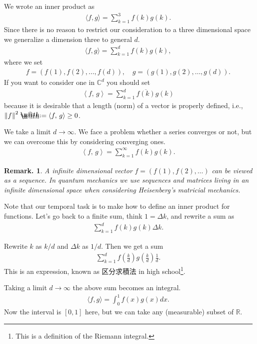 \documentclass[openany, a4paper, oneside]{jsbook}
\makeatletter
\newcommand*{\defeq}{\mathrel{\rlap{%
\raisebox{0.3ex}{$\m@th\cdot$}}%
\raisebox{-0.3ex}{$\m@th\cdot$}}%
=}
\theoremstyle{break}
\theoremstyle{breakdefn}
\newtheorem{rem}[thm]{Remark.}
\newcommand{\norm}[1]{\left\Vert#1\right\Vert}
\newcommand{\rbk}[1]{\left (#1\right)}
\newcommand{\bkt}[2]{\left\langle#1,\,#2\right\rangle}
\newcommand{\bbC}{\mathbb{C}}
\newcommand{\bbR}{\mathbb{R}}
\makeatother
\begin{document}
We wrote an inner product as
\begin{align}
 \langle f , g \rangle
 =
 \sum_{k=1}^3 f(k)g(k).
\end{align}
Since there is no reason to restrict our consideration to a three dimensional space
we generalize a dimension three to general $d$.
\begin{align}
 \langle f , g \rangle
 =
 \sum_{k=1}^d f(k)g(k),
\end{align}
where we set
\begin{align}
 f = \rbk{f(1), f(2), \dots, f(d)}, \quad
 g = \rbk{g(1), g(2), \dots, g(d)}.
\end{align}
If you want to consider one in $\bbC^d$ you should set
\begin{align}
 \bkt{f}{g}
 =
 \sum_{k=1}^d \overline{f(k)} g(k)
\end{align}
because it is desirable that a length (norm) of a vector is
properly defined, i.e., $\norm{f}^2 \defeq \bkt{f}{g} \geq 0$.

We take a limit $d \to \infty$.
We face a problem whether a series converges or not,
but we can overcome this by considering converging ones.
\begin{align}
 \bkt{f}{g}
 =
 \sum_{k=1}^{\infty} f(k)g(k).
\end{align}

\begin{rem}
 A infinite dimensional vector $f = (f(1), f(2), \dots)$
 can be viewed as a sequence.
 In quantum mechanics we use sequences and matrices living in an infinite dimensional space
 when considering Heisenberg's matricial mechanics.
\end{rem}

Note that our temporal task is to make how to define an inner product for functions.
Let's go back to a finite sum, think $1 = \Delta k$, and rewrite a sum as
\begin{align}
 \sum_{k=1}^{d} f(k)g(k) \Delta k.
\end{align}

Rewrite $k$ as $k/d$ and $\Delta k$ as $1/d$.
Then we get a sum
\begin{align}
 \sum_{k=1}^{d} f \left( \frac{k}{d} \right) g \left( \frac{k}{d} \right) \frac{1}{d}.
\end{align}
This is an expression, known as 区分求積法 in high school\footnote{This is a definition of the Riemann integral.
 }.

Taking a limit $d \to \infty$ the above sum becomes an integral.
\begin{align}
 \langle f, g \rangle
 =
 \int_{0}^{1} f(x) g(x) dx.
\end{align}
Now the interval is $[0, 1]$ here,
but we can take any (measurable) subset of $\bbR$.
\end{document}
